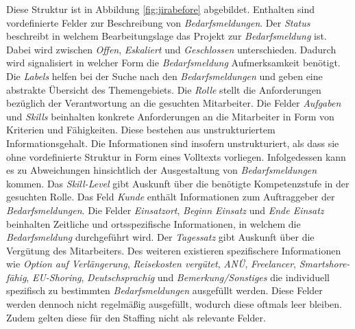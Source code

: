 Diese Struktur ist in Abbildung \ref{fig:jirabefore} abgebildet. Enthalten sind vordefinierte Felder zur Beschreibung von \emph{Bedarfsmeldungen}. Der \emph{Status} beschreibt in welchem Bearbeitungslage das Projekt zur \emph{Bedarfsmeldung} ist. Dabei wird zwischen \emph{Offen}, \emph{Eskaliert} und \emph{Geschlossen} unterschieden. Dadurch wird signalisiert in welcher Form die \emph{Bedarfsmeldung} Aufmerksamkeit benötigt. Die \emph{Labels} helfen bei der Suche nach den \emph{Bedarfsmeldungen} und geben eine abstrakte Übersicht des Themengebiets. Die \emph{Rolle} stellt die Anforderungen bezüglich der Verantwortung an die gesuchten Mitarbeiter. Die Felder \emph{Aufgaben} und \emph{Skills} beinhalten konkrete Anforderungen an die Mitarbeiter in Form von Kriterien und Fähigkeiten. Diese bestehen aus unstrukturiertem Informationsgehalt. Die Informationen sind insofern unstrukturiert, als dass sie ohne vordefinierte Struktur in Form eines Volltexts vorliegen. Infolgedessen kann es zu Abweichungen hinsichtlich der Ausgestaltung von \emph{Bedarfsmeldungen} kommen. Das \emph{Skill-Level} gibt Auskunft über die benötigte Kompetenzstufe in der gesuchten Rolle. Das Feld \emph{Kunde} enthält Informationen zum Auftraggeber der \emph{Bedarfsmeldungen}. Die Felder \emph{Einsatzort}, \emph{Beginn Einsatz} und \emph{Ende Einsatz} beinhalten Zeitliche und ortsspezifische Informationen, in welchem die \emph{Bedarfsmeldung} durchgeführt wird. Der \emph{Tagessatz} gibt Auskunft über die Vergütung des Mitarbeiters. Des weiteren existieren spezifischere Informationen wie \emph{Option auf Verlängerung}, \emph{Reisekosten vergütet}, \emph{ANÜ}, \emph{Freelancer}, \emph{Smartshore-fähig}, \emph{EU-Shoring}, \emph{Deutschsprachig} und \emph{Bemerkung/Sonstiges} die individuell spezifisch zu bestimmten \emph{Bedarfsmeldungen} ausgefüllt werden. Diese Felder werden dennoch nicht regelmäßig ausgefüllt, wodurch diese oftmals leer bleiben. Zudem gelten diese für den Staffing nicht als relevante Felder.\\
